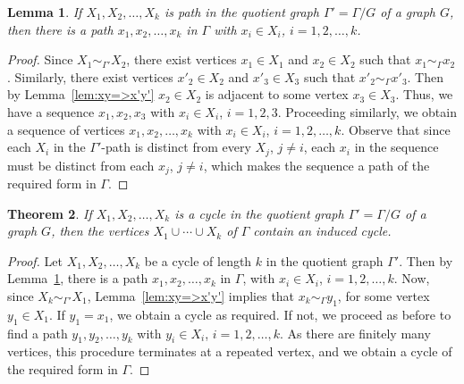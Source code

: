 \documentclass[12pt,a4paper]{amsart}
\newtheorem{Theorem}{Theorem}[section]
\newtheorem{Lemma}[Theorem]{Lemma}
\theoremstyle{remark}
\theoremstyle{definition}
\newcommand{\adj}[1]{\sim_{\scriptscriptstyle #1}}
\begin{document}
\begin{Lemma}
\label{lem:PathCorr}
If $X_1, X_2, \ldots, X_k$ is path in the quotient graph $\Gamma' = \Gamma/G$ of a graph $G$, then there is a path $x_1, x_2, \ldots, x_k$ in $\Gamma$ with $x_i \in X_i$, $i = 1, 2, \ldots, k$.
\end{Lemma}
\begin{proof}
Since $X_1 \adj{\Gamma'} X_2$, there exist vertices $x_1 \in X_1$ and $x_2 \in X_2$ such that $x_1 \adj{\Gamma} x_2$. Similarly, there exist vertices $x'_2 \in X_2$ and $x'_3 \in X_3$ such that $x'_2 \adj{\Gamma} x'_3$. Then by Lemma~\ref{lem:xy=>x'y'} $x_2 \in X_2$ is adjacent to some vertex $x_3 \in X_3$. Thus, we have a sequence $x_1, x_2, x_3$ with $x_i \in X_i$, $i = 1, 2, 3$. Proceeding similarly, we obtain a sequence of vertices $x_1, x_2, \ldots, x_k$ with $x_i \in X_i$, $i = 1, 2, \ldots, k$. Observe that since each $X_i$ in the $\Gamma'$-path is distinct from every $X_j$, $j \ne i$, each $x_i$ in the sequence must be distinct from each $x_j$, $j \ne i$, which makes the sequence a path of the required form in $\Gamma$.
\end{proof}

\begin{Theorem}
\label{thm:CycCorr}
If $X_1, X_2, \ldots, X_k$ is a cycle in the quotient graph $\Gamma' = \Gamma/G$ of a graph $G$, then the vertices $X_1 \cup \cdots \cup X_k$ of $\Gamma$ contain an induced cycle.
\end{Theorem}
\begin{proof}
Let $X_1, X_2, \ldots, X_k$ be a cycle of length $k$ in the quotient graph $\Gamma'$. Then by Lemma~\ref{lem:PathCorr}, there is a path $x_1, x_2, \ldots, x_k$ in $\Gamma$, with $x_i \in X_i$, $i = 1, 2, \ldots, k$. Now, since $X_k \adj{\Gamma'} X_1$, Lemma~\ref{lem:xy=>x'y'} implies that $x_k \adj{\Gamma} y_1$, for some vertex $y_1 \in X_1$. If $y_1 = x_1$, we obtain a cycle as required. If not, we proceed as before to find a path $y_1, y_2, \ldots, y_k$ with $y_i \in X_i$, $i = 1, 2, \ldots, k$. As there are finitely many vertices, this procedure terminates at a repeated vertex, and we obtain a cycle of the required form in $\Gamma$.
\end{proof}
\end{document}
